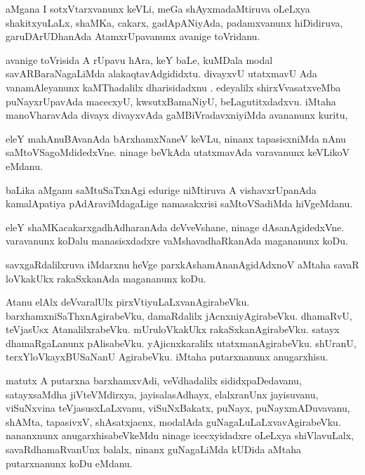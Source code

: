 \documentclass{article}
\begin{document}
\begin{mn}
aMgana I sotxVtarxvanunx  keVLi, meGa shAyxmadaMtiruva oLeLxya shakitxyuLaLx, 
shaMKa, cakarx, gadApANiyAda, padamxvanunx hiDidiruva, garuDArUDhanAda 
AtamxrUpavanunx avanige toVridanu.
\end{mn}

\begin{mn}
avanige toVrisida A rUpavu hAra, keY baLe, kuMDala modal savARBaraNagaLiMda 
alakaqtavAdgididxtu.  divayxvU utatxmavU Ada vanamAleyanunx kaMThadalilx 
dharisidadxnu .  edeyalilx shirxVvasatxveMba puNayxrUpavAda macecxyU, 
kwsutxBamaNiyU, beLagutitxdadxvu.  iMtaha manoVharavAda divayx divayxvAda  
gaMBiVradavxniyiMda avananunx kuritu,
\end{mn}

\begin{mn}
eleY mahAnuBAvanAda bArxhamxNaneV keVLu, ninanx tapasisxniMda nAnu 
saMtoVSagoMdidedxVne. ninage beVkAda utatxmavAda varavanunx keVLikoV eMdanu.
\end{mn}

\begin{mn}
baLika aMganu saMtuSaTxnAgi edurige niMtiruva A vishavxrUpanAda kamalApatiya 
pAdAraviMdagaLige namasakxrisi saMtoVSadiMda hiVgeMdanu.
\end{mn}

\begin{mn}
eleY shaMKacakarxgadhAdharanAda deVveVshane, ninage dAsanAgidedxVne.
varavanunx koDalu manasisxdadxre vaMshavadhaRkanAda magananunx koDu.
\end{mn}

\begin{mn}
 savxgaRdalilxruva  iMdarxnu heVge parxkAshamAnanAgidAdxnoV aMtaha savaR 
 loVkakUkx rakaSxkanAda  magananunx koDu.
\end{mn}

\begin{mn}
Atanu elAlx deVvaralUlx pirxVtiyuLaLxvanAgirabeVku. barxhamxniSaThxnAgirabeVku,
damaRdalilx jAcnxniyAgirabeVku.  dhamaRvU, teVjasUsx  AtanalilxrabeVku. 
mUruloVkakUkx rakaSxkanAgirabeVku.  satayx dhamaRgaLanunx pAlisabeVku. 
yAjicnxkaralilx utatxmanAgirabeVku. shUranU, terxYloVkayxBUSaNanU 
AgirabeVku. iMtaha putarxnanunx anugarxhisu.
\end{mn}

\begin{mn}
matutx A putarxna barxhamxvAdi, veVdhadalilx sididxpaDedavanu, satayxsaMdha jiVteVMdirxya, 
jayisalasAdhayx, elalxranUnx jayisuvanu, viSuNxvina teVjasusxLaLxvanu, viSuNxBakatx, 
puNayx, puNayxmADuvavanu, shAMta, tapasivxV, shAsatxjacnx, modalAda guNagaLuLaLxvavAgirabeVku.  
nananxnunx anugarxhisabeVkeMdu ninage icecxyidadxre oLeLxya shiVlavuLalx, 
savaRdhamaRvanUnx balalx, ninanx guNagaLiMda kUDida aMtaha putarxnanunx koDu eMdanu. 
\end{mn}
\end{document}
